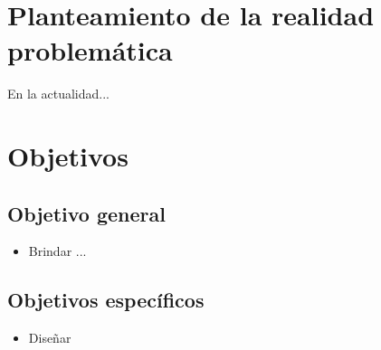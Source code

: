 
\section{Planteamiento de la realidad problemática}
\begin{adjustwidth}{2.4em}{0em}
En la actualidad...
\end{adjustwidth}

\section{Objetivos}
\subsection{Objetivo general}
\begin{adjustwidth}{2.4em}{0em}
\begin{itemize}
	\item Brindar ...
\end{itemize}
\end{adjustwidth}

\subsection{Objetivos específicos}
\begin{adjustwidth}{2.4em}{0em}
\begin{itemize}
	\item Diseñar 
\end{itemize}
\end{adjustwidth}


